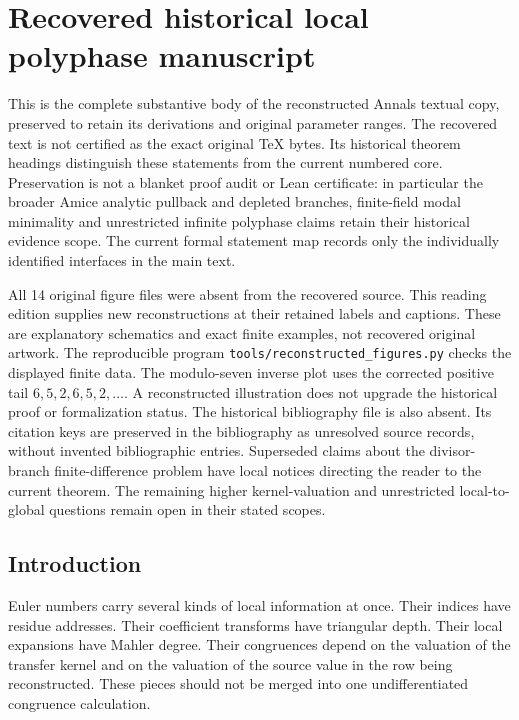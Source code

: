 \clearpage\section{Recovered historical local polyphase manuscript}\label{app:recovered}
This is the complete substantive body of the reconstructed Annals textual
copy, preserved to retain its derivations and original parameter ranges.
The recovered text is not certified as the exact original TeX bytes. Its
historical theorem headings distinguish these statements from the current
numbered core. Preservation is not a blanket proof audit or Lean certificate:
in particular the broader Amice analytic pullback and depleted branches,
finite-field modal minimality and unrestricted infinite polyphase claims
retain their historical evidence scope. The current formal statement map
records only the individually identified interfaces in the main text.

All 14 original figure files were absent from the recovered source. This
reading edition supplies new reconstructions at their retained labels and
captions. These are explanatory schematics and exact finite examples, not
recovered original artwork. The reproducible program
\nolinkurl{tools/reconstructed_figures.py} checks the displayed finite data.
The modulo-seven inverse plot uses the corrected positive tail
$6,5,2,6,5,2,\ldots$. A reconstructed illustration does not upgrade the
historical proof or formalization status. The historical bibliography file is also absent. Its citation keys
are preserved in the bibliography as unresolved source records, without
invented bibliographic entries. Superseded claims about the divisor-branch
finite-difference problem have local notices directing the reader to the
current theorem. The remaining higher kernel-valuation and unrestricted
local-to-global questions remain open in their stated scopes.

\subsection{Introduction}\label{hist:sec:introduction}

Euler numbers carry several kinds of local information at once. Their indices have residue addresses. Their coefficient transforms have triangular depth. Their local expansions have Mahler degree. Their congruences depend on the valuation of the transfer kernel and on the valuation of the source value in the row being reconstructed. These pieces should not be merged into one undifferentiated congruence calculation.

